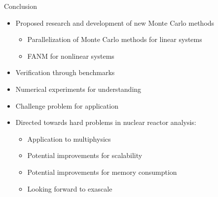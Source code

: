 \documentclass{beamer}
\begin{document}
\begin{frame}{Conclusion}

  \begin{itemize}
  \item Proposed research and development of new Monte Carlo methods
    \begin{itemize}
    \item Parallelization of Monte Carlo methods for linear systems
    \item FANM for nonlinear systems
    \end{itemize}
  \item Verification through benchmarks
  \item Numerical experiments for understanding
  \item Challenge problem for application
  \item Directed towards hard problems in nuclear reactor analysis:
    \begin{itemize}
    \item Application to multiphysics
    \item Potential improvements for scalability
    \item Potential improvements for memory consumption
    \item Looking forward to exascale
    \end{itemize}
  \end{itemize}

\end{frame}

\end{document}

